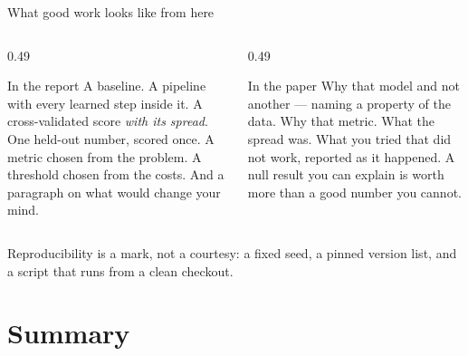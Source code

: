 \documentclass[aspectratio=169]{beamer}
\begin{document}
\begin{frame}[shrink=6]{What good work looks like from here}
  \begin{columns}[T]
    \begin{column}{0.49\textwidth}
      \begin{block}{In the report}
        A baseline. A pipeline with every learned step inside it. A
        cross-validated score \emph{with its spread}. One held-out number,
        scored once. A metric chosen from the problem. A threshold chosen
        from the costs. And a paragraph on what would change your mind.
      \end{block}
    \end{column}
    \begin{column}{0.49\textwidth}
      \begin{block}{In the paper}
        Why that model and not another --- naming a property of the data.
        Why that metric. What the spread was. What you tried that did not
        work, reported as it happened. A null result you can explain is
        worth more than a good number you cannot.
      \end{block}
    \end{column}
  \end{columns}
  \begin{center}
    \small Reproducibility is a mark, not a courtesy: a fixed seed, a pinned
    version list, and a script that runs from a clean checkout.
  \end{center}
\end{frame}

\section{Summary}
\label{sec:summary}
\end{document}

